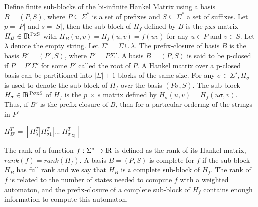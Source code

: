 \documentclass[letterpaper]{article}
\begin{document}
Define finite sub-blocks of the bi-infinite Hankel Matrix using a basis $B = (P, S)$, where $P \subseteq \Sigma^{*}$ is a set of prefixes and $S \subseteq \Sigma^{*}$ a set of suffixes. Let $p = |P|$ and $s = |S|$, then the sub-block of $H_{f}$ defined by $B$ is the $p $x$ s$ matrix $H_{B} \in \rm I\!R^{PxS}$ with $H_{B}(u,v) = H_{f}(u,v) = f(uv)$ for any $u \in P$ and $v \in S$. Let $\lambda$ denote the empty string. Let $\Sigma' = \Sigma\cup\lambda$. The prefix-closure of basis $B$ is the basis $B' = (P', S)$, where $P' = P\Sigma'$. A basis $B = (P,S)$ is said to be p-closed if $P = P'\Sigma'$ for some $P'$ called the root of $P$. A Hankel matrix over a p-closed basis can be partitioned into $|\Sigma| + 1$ blocks of the same size. For any $\sigma \in \Sigma', H_{\sigma}$ is used to denote the sub-block of $H_{f}$ over the basis $(P\sigma, S)$. The sub-block $H_{\sigma} \in \rm I\!R^{
P\sigma xS}$ of $H_{f}$ is the $p$ × $s$ matrix defined by $H_{\sigma}(u,v) = H_{f}(u\sigma, v)$. Thus, if $B'$ is the prefix-closure of $B$, then for a particular ordering of the strings in $P'$ 

\begin{center}
$H^{T}_{B'} = \left[ H_{\lambda}^{T} | H_{\sigma 1}^{T} | ... |H_{\sigma_{|\Sigma|}}^{T} \right] $
\end{center}

The rank of a function $f : \Sigma^{*} \rightarrow \rm I\!R$ is defined as the rank of its Hankel matrix, $rank(f) = rank(H_{f})$. A basis $B = (P,S)$ is complete for $f$ if the sub-block $H_{B}$ has full rank and we say that $H_{B}$ is a complete sub-block of $H_{f}$. The rank of $f$ is related to the number of states needed to compute $f$ with a weighted automaton, and the prefix-closure of a complete sub-block of $H_{f}$ contains enough information to compute this automaton. 
\end{document}
